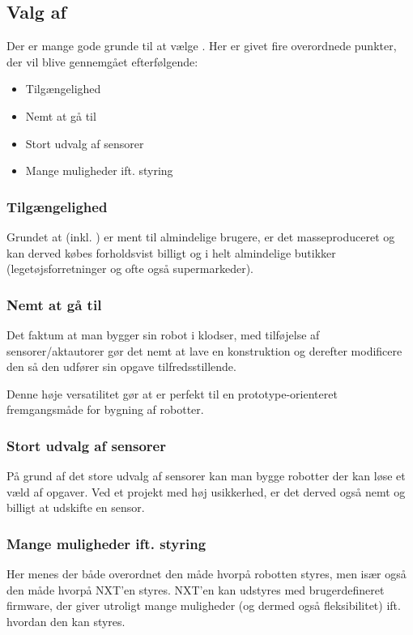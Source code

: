 \subsection{Valg af \legoms}
Der er mange gode grunde til at vælge \legoms.
Her er givet fire overordnede punkter, der vil blive gennemgået efterfølgende:

\begin{itemize}
\item{Tilgængelighed}
\item{Nemt at gå til}
\item{Stort udvalg af sensorer}
\item{Mange muligheder ift. styring}
\end{itemize}

\subsubsection{Tilgængelighed}
Grundet at \lego (inkl. \legoms) er ment til almindelige brugere, er det masseproduceret og kan derved købes forholdsvist billigt og i helt almindelige butikker (legetøjsforretninger og ofte også supermarkeder).

\subsubsection{Nemt at gå til}
Det faktum at man bygger sin robot i \lego klodser, med tilføjelse af \legoms sensorer/aktautorer gør det nemt at lave en konstruktion og derefter modificere den så den udfører sin opgave tilfredsstillende.

Denne høje versatilitet gør at \lego er perfekt til en prototype-orienteret fremgangsmåde for bygning af robotter.

\subsubsection{Stort udvalg af sensorer}
På grund af det store udvalg af sensorer kan man bygge robotter der kan løse et væld af opgaver.
Ved et projekt med høj usikkerhed, er det derved også nemt og billigt at udskifte en sensor.

\subsubsection{Mange muligheder ift. styring}
Her menes der både overordnet den måde hvorpå robotten styres, men især også den måde hvorpå NXT'en styres.
NXT'en kan udstyres med brugerdefineret firmware, der giver utroligt mange muligheder (og dermed også fleksibilitet) ift. hvordan den kan styres.

